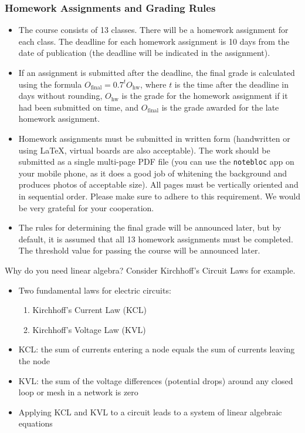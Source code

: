 \documentclass[fullscreen=true, bookmarks=true, hyperref={pdfencoding=unicode}]{beamer}
\begin{document}
\begin{frame}[t]
  \frametitle{Homework Assignments and Grading Rules}

  {\scriptsize
  \begin{itemize}
    \item The course consists of 13 classes. There will be a homework assignment 
  for each class. The deadline for each homework assignment is 10 days 
  from the date of publication (the deadline will be indicated 
  in the assignment). 
  \item If an assignment is submitted after the deadline, 
  the final grade is calculated using the 
  formula $O_{\text{final}} = 0.7^t O_{\text{hw}}$, 
  where $t$ is the time after the deadline in days without rounding, 
  $O_{\text{hw}}$ is the grade for the homework assignment 
  if it had been submitted on time, and 
  $O_{\text{final}}$ is the grade awarded for the late homework assignment.
  
  \item Homework assignments must be submitted in written form 
  (handwritten or using \LaTeX, virtual boards are also acceptable). 
  The work should be submitted as a single multi-page PDF file 
  (you can use the \texttt{notebloc} app on your mobile phone, as it does 
  a good job of whitening the background and produces photos 
  of acceptable size). 
  All pages must be vertically oriented and in sequential order. 
  Please make sure to adhere to this requirement. We would be very grateful for your cooperation.
  
  \item The rules for determining the final grade will be announced later, 
  but by default, it is assumed that all 13 homework assignments 
  must be completed. The threshold value for passing the course 
  will be announced later.
  \end{itemize}
  }
\end{frame}


\begin{frame}{Why do you need linear algebra?}
  Consider Kirchhoff's Circuit Laws for example.
  \begin{itemize}
  \item Two fundamental laws for electric circuits:
    \begin{enumerate}
      \item Kirchhoff's Current Law (KCL)
      \item Kirchhoff's Voltage Law (KVL)
    \end{enumerate}
  \pause\item KCL: the sum of currents entering a node equals the sum of currents leaving the node
  \pause\item KVL: the sum of the voltage differences (potential drops) around any closed loop or mesh in a network is zero
  \pause\item Applying KCL and KVL to a circuit leads to a system of linear algebraic equations
  \end{itemize}  
\end{frame}  
\end{document}
